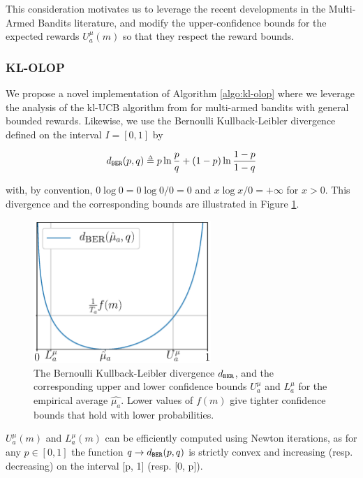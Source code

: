 This consideration motivates us to leverage the recent developments in the Multi-Armed Bandits literature, and modify the upper-confidence bounds for the expected rewards $U^\mu_a(m)$ so that they respect the reward bounds.


\subsubsection{KL-OLOP}
\label{sec:kl-olop-kl-olop}

\noindent
We propose a novel implementation of Algorithm \ref{algo:kl-olop} where we leverage the analysis of the kl-UCB algorithm from \citep{Cappe2013} for multi-armed bandits with general bounded rewards.
Likewise, we use the Bernoulli Kullback-Leibler divergence defined on the interval $I=[0,1]$ by

\begin{equation*}
\dber(p, q) \eqdef p \log \frac{p}{q} + (1-p)\log\frac{1-p}{1-q}
\end{equation*}

\noindent
with, by convention, $0 \log 0 = 0 \log 0/0 = 0$ and $x \log x /0 = +\infty$ for $x>0$.
This divergence and the corresponding bounds are illustrated in Figure \ref{fig:ukl}.

\begin{figure}[tp]
	\centering
	\includegraphics[width=0.6\textwidth]{img/ukl}
	\caption{The Bernoulli Kullback-Leibler divergence $d_\texttt{BER}$, and the corresponding upper and lower confidence bounds $U^{\mu}_a$ and $L^{\mu}_a$ for the empirical average $\hat{\mu_a}$. Lower values of $f(m)$ give tighter confidence bounds that hold with lower probabilities.}
	\label{fig:ukl}
\end{figure}

$U^{\mu}_a(m)$ and $L^{\mu}_a(m)$ can be efficiently computed using Newton iterations, as for any $p\in[0, 1]$ the function $q \rightarrow d_\texttt{BER}(p,q)$ is strictly convex and increasing (resp. decreasing) on the interval [p, 1] (resp. [0, p]).

